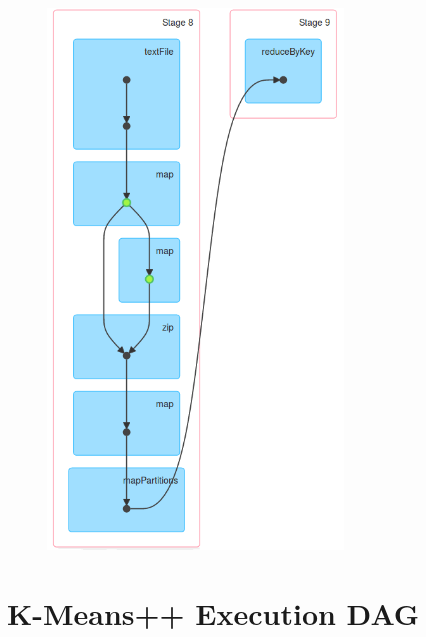\documentclass{l4proj}
\begin{document}
\begin{appendices}
\begin{figure}[H]
	\centering
    \label{fig:dag1}
    \includegraphics[width=0.70\textwidth]{images/DAG1}
\end{figure}

\section{K-Means++ Execution DAG}


\end{appendices}
\end{document}
